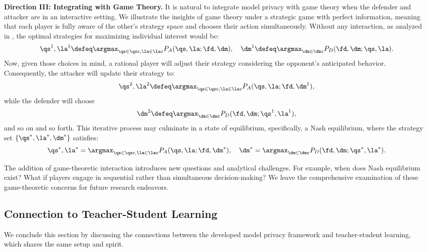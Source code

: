     \textbf{Direction III: Integrating with Game Theory.}
    It is natural to integrate model privacy with game theory when the defender and attacker are in an interactive setting. 
    We illustrate the insights of game theory under a strategic game with perfect information, meaning that each player is fully aware of the other's strategy space and chooses their action simultaneously.
    Without any interaction, as analyzed in , the optimal strategies for maximizing individual interest would be:
    \begin{align*}
        \qs^{1}, \la^{1} \defeq \argmax_{\qs \in \qsc,\la \in \lac}  P_A(\qs, \la;\fd, \dm), \quad
        \dm^{1} \defeq \argmax_{\dm \in \dmc}  P_D(\fd, \dm;\qs, \la).
    \end{align*}
    Now, given those choices in mind, a rational player will adjust their strategy considering the opponent's anticipated behavior. Consequently,  the attacker will update their strategy to:
    \begin{align*}
         \qs^{2}, \la^{2} \defeq \argmax_{\qs \in \qsc,\la \in \lac} P_A(\qs, \la;\fd, \dm^{1}) ,
    \end{align*}
    while the defender will choose
    \begin{align*}
        \dm^{2} \defeq \argmax_{\dm \in \dmc} P_D(\fd, \dm;\qs^{1}, \la^{1}) ,
    \end{align*}
    and so on and so forth. This iterative process may culminate in a state of equilibrium, specifically, a Nash equilibrium, where the strategy set $\{\qs^{*}, \la^{*}, \dm^{*}\}$ satisfies:
    \begin{align*}
        \qs^{*}, \la^{*} = \argmax_{\qs \in \qsc,\la \in \lac} P_A(\qs, \la;\fd, \dm^{*})  ,
        \quad \dm^{*} = \argmax_{\dm \in \dmc} P_D(\fd, \dm;\qs^{*}, \la^{*}).
    \end{align*}

   The addition of game-theoretic interaction introduces new questions and analytical challenges. For example, when does Nash equilibrium exist? What if players engage in sequential rather than simultaneous decision-making? We leave the comprehensive examination of these game-theoretic concerns for future research endeavors.




    \subsection{Connection to Teacher-Student Learning}\label{subsec:related}
    We conclude this section by discussing the connections between the developed model privacy framework and teacher-student learning, which shares the same setup and spirit. 

